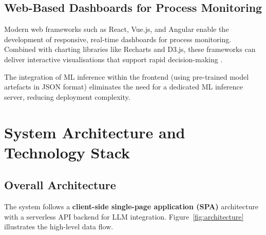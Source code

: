 \documentclass[12pt,a4paper]{report}
\begin{document}
\section{Web-Based Dashboards for Process Monitoring}

Modern web frameworks such as React, Vue.js, and Angular enable the development of responsive, real-time dashboards for process monitoring. Combined with charting libraries like Recharts and D3.js, these frameworks can deliver interactive visualisations that support rapid decision-making \cite{react2024docs}.

The integration of ML inference within the frontend (using pre-trained model artefacts in JSON format) eliminates the need for a dedicated ML inference server, reducing deployment complexity.


\chapter{System Architecture and Technology Stack}
\label{ch:architecture}

\section{Overall Architecture}

The system follows a \textbf{client-side single-page application (SPA)} architecture with a serverless API backend for LLM integration. Figure~\ref{fig:architecture} illustrates the high-level data flow.
\end{document}
